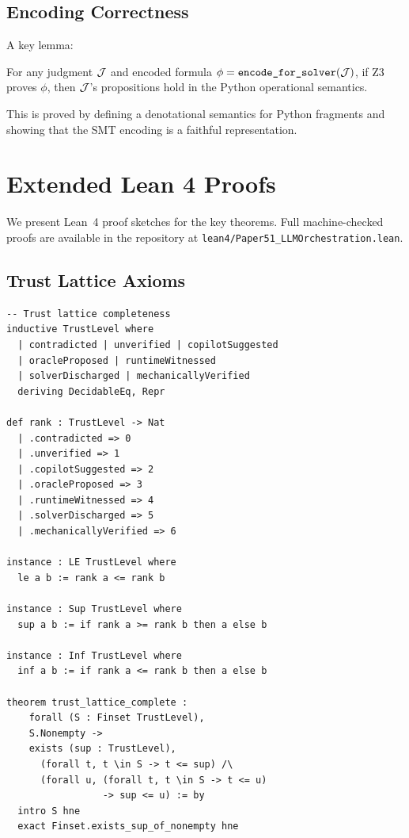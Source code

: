 \documentclass[11pt]{article}
\begin{document}
\subsection{Encoding Correctness}
A key lemma:

\begin{lemma}\label{lem:encoding-fidelity}
For any judgment $\mathcal{J}$ and encoded formula $\phi = \texttt{encode\_for\_solver}(\mathcal{J})$, 
if Z3 proves $\phi$, then $\mathcal{J}$'s propositions hold in the Python operational 
semantics.
\end{lemma}

This is proved by defining a denotational semantics for Python fragments and 
showing that the SMT encoding is a faithful representation.

\section{Extended Lean 4 Proofs}\label{sec:lean-extended}

We present Lean~4 proof sketches for the key theorems.  Full
machine-checked proofs are available in the repository at
\texttt{lean4/Paper51\_LLMOrchestration.lean}.

\subsection{Trust Lattice Axioms}

\begin{lstlisting}[style=jugeo-output]
-- Trust lattice completeness
inductive TrustLevel where
  | contradicted | unverified | copilotSuggested
  | oracleProposed | runtimeWitnessed
  | solverDischarged | mechanicallyVerified
  deriving DecidableEq, Repr

def rank : TrustLevel -> Nat
  | .contradicted => 0
  | .unverified => 1
  | .copilotSuggested => 2
  | .oracleProposed => 3
  | .runtimeWitnessed => 4
  | .solverDischarged => 5
  | .mechanicallyVerified => 6

instance : LE TrustLevel where
  le a b := rank a <= rank b

instance : Sup TrustLevel where
  sup a b := if rank a >= rank b then a else b

instance : Inf TrustLevel where
  inf a b := if rank a <= rank b then a else b

theorem trust_lattice_complete :
    forall (S : Finset TrustLevel),
    S.Nonempty ->
    exists (sup : TrustLevel),
      (forall t, t \in S -> t <= sup) /\
      (forall u, (forall t, t \in S -> t <= u)
                 -> sup <= u) := by
  intro S hne
  exact Finset.exists_sup_of_nonempty hne
\end{lstlisting}
\end{document}
